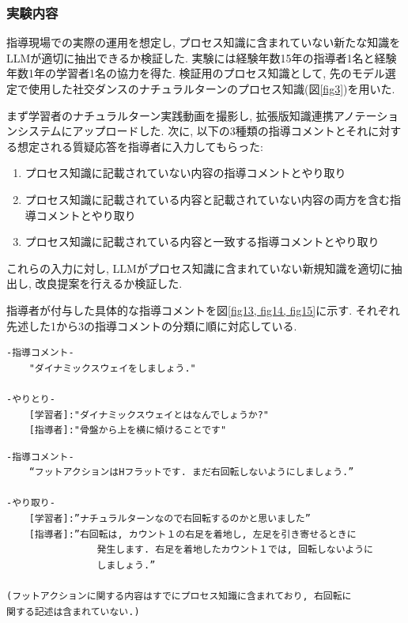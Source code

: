 \subsubsection{実験内容}
指導現場での実際の運用を想定し, プロセス知識に含まれていない新たな知識をLLMが適切に抽出できるか検証した. 実験には経験年数15年の指導者1名と経験年数1年の学習者1名の協力を得た. 検証用のプロセス知識として, 先のモデル選定で使用した社交ダンスのナチュラルターンのプロセス知識(図\ref{fig3})を用いた.

まず学習者のナチュラルターン実践動画を撮影し, 拡張版知識連携アノテーションシステムにアップロードした. 次に, 以下の3種類の指導コメントとそれに対する想定される質疑応答を指導者に入力してもらった:

\begin{enumerate}
    \item プロセス知識に記載されていない内容の指導コメントとやり取り
    
    \item プロセス知識に記載されている内容と記載されていない内容の両方を含む指導コメントとやり取り
    
    \item プロセス知識に記載されている内容と一致する指導コメントとやり取り
    
\end{enumerate}

これらの入力に対し, LLMがプロセス知識に含まれていない新規知識を適切に抽出し, 改良提案を行えるか検証した. 

指導者が付与した具体的な指導コメントを図\ref{fig13, fig14, fig15}に示す. それぞれ先述した1から3の指導コメントの分類に順に対応している.


\begin{tcolorbox}[breakable, colback=white, colframe=black]
    \begin{verbatim}
-指導コメント- 
    "ダイナミックスウェイをしましょう."

-やりとり- 
    [学習者]:"ダイナミックスウェイとはなんでしょうか?" 
    [指導者]:"骨盤から上を横に傾けることです" 
    \end{verbatim}
\end{tcolorbox}
    
\label{fig13}




\begin{tcolorbox}[breakable, colback=white, colframe=black]
    \begin{verbatim}
-指導コメント-
    “フットアクションはHフラットです. まだ右回転しないようにしましょう.”

-やり取り-
    [学習者]:”ナチュラルターンなので右回転するのかと思いました”
    [指導者]:”右回転は, カウント１の右足を着地し, 左足を引き寄せるときに
                発生します. 右足を着地したカウント１では, 回転しないように
                しましょう.”

(フットアクションに関する内容はすでにプロセス知識に含まれており, 右回転に
関する記述は含まれていない.)
    \end{verbatim}
\end{tcolorbox}
    
